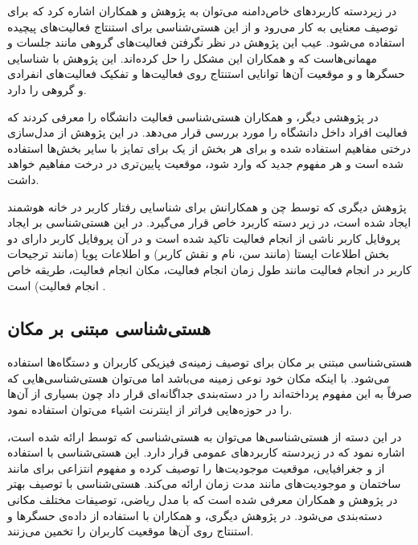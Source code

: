 در زیردسته کاربردهای خاص‌دامنه می‌توان به پژوهش  و همکاران \cite{x232Z25} اشاره کرد که برای توصیف معنایی  به کار می‌رود و از این هستی‌شناسی برای استنتاج فعالیت‌های پیچیده استفاده می‌شود. عیب این پژوهش در نظر نگرفتن فعالیت‌های گروهی مانند جلسات و مهمانی‌هاست که  و همکاران \cite{x232Z26} این مشکل را حل کرده‌اند. این پژوهش با شناسایی حسگرها و و موقعیت آن‌ها توانایی استنتاج روی فعالیت‌ها و تفکیک فعالیت‌های انفرادی و گروهی را دارد.

در پژوهشی دیگر،  و همکاران \cite{x232Z27} هستی‌شناسی فعالیت دانشگاه را معرفی کردند که فعالیت افراد داخل دانشگاه را مورد بررسی قرار می‌دهد. در این پژوهش از مدل‌سازی درختی مفاهیم استفاده شده و برای هر بخش از یک  برای تمایز با سایر بخش‌ها استفاده شده است و هر مفهوم جدید که وارد شود، موقعیت پایین‌تری در درخت مفاهیم خواهد داشت.

پژوهش دیگری که توسط چن و همکارانش \cite{x232Z2} برای شناسایی رفتار کاربر در خانه هوشمند ایجاد شده است، در زیر دسته کاربرد خاص قرار می‌‌گیرد. در این هستی‌شناسی بر ایجاد پروفايل کاربر ناشی از انجام فعاليت تاکید شده است و در آن پروفايل کاربر دارای دو بخش اطلاعات ایستا (مانند سن، نام و نقش کاربر) و اطلاعات پویا (مانند ترجيحات کاربر در انجام فعاليت مانند طول زمان انجام فعاليت، مکان انجام فعاليت، طريقه خاص انجام فعاليت) است \cite{x232Z3}.

\subsection{هستی‌شناسی مبتنی بر مکان}

هستی‌شناسی مبتنی بر مکان برای توصیف زمینه‌ی فیزیکی کاربران و دستگاه‌ها استفاده می‌شود. با اینکه مکان خود نوعی زمینه می‌‌باشد اما می‌‌توان هستی‌‌شناسی‌‌هایی که صرفاً به این مفهوم پرداخته‌‌اند را در دسته‌بندی جداگانه‌‌ای قرار داد چون بسیاری از آن‌ها را در حوزه‌‌هایی فراتر از اينترنت اشیاء می‌‌توان استفاده نمود. 

در این دسته از هستی‌شناسی‌ها می‌توان به هستی‌شناسی  که توسط  \cite{x232Z30} ارائه شده است، اشاره نمود که در زیردسته کاربردهای عمومی قرار دارد. این هستی‌شناسی با استفاده از  و  جغرافیایی، موقعیت موجودیت‌ها را توصیف کرده و مفهوم انتزاعی برای  مانند ساختمان و موجودیت‌های  مانند مدت زمان ارائه می‌کند. هستی‌شناسی با توصیف بهتر در پژوهش  و همکاران \cite{x232Z31} معرفی شده است که با مدل ریاضی، توصیفات مختلف مکانی دسته‌بندی می‌شود. در پژوهش دیگری،  و همکاران \cite{x232Z32} با استفاده از داده‌ی حسگرها و استنتاج روی آن‌ها موقعیت کاربران را تخمین می‌زنند.

